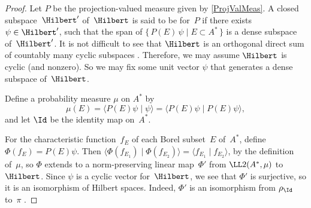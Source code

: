 \begin{proof}
Let $P$ be the projection-valued measure given by \cref{ProjValMeas}.
A closed subspace~$\Hilbert'$ of~$\Hilbert$ is said to be  for~$P$ if there exists $\psi \in \Hilbert'$, such that the span of $\{\, P(E)\,\psi \mid E \subset A^* \,\}$ is a dense subspace of~$\Hilbert'$. It is not difficult to see that $\Hilbert$ is an orthogonal direct sum of countably many cyclic subspaces . Therefore, we may assume $\Hilbert$ is cyclic  (and nonzero). So we may fix some unit vector $\psi$ that generates a dense subspace of~$\Hilbert$.

Define a probability measure $\mu$ on $A^*$ by 
	$$ \mu(E) = \langle P(E)\psi \mid \psi \rangle = \langle P(E)\psi \mid P(E)\psi \rangle ,$$
and let $\Id$ be the identity map on~$A^*$.

For the characteristic function~$f_E$ of each Borel subset~$E$ of~$A^*$, define $\Phi(f_E) = P(E) \psi$. Then $\langle \Phi(f_{E_1}) \mid  \Phi(f_{E_2}) \rangle =  \langle f_{E_1} \mid  f_{E_2} \rangle$, by the definition of~$\mu$, so $\Phi$ extends to a norm-preserving linear map~$\Phi'$ from $\LL2(A^*,\mu)$ to~$\Hilbert$. Since $\psi$ is a cyclic vector for~$\Hilbert$, we see that $\Phi'$ is surjective, so it is an isomorphism of Hilbert spaces. Indeed, $\Phi'$ is an isomorphism from $\rho_{\Id}$ to~$\pi$ .
\end{proof}

